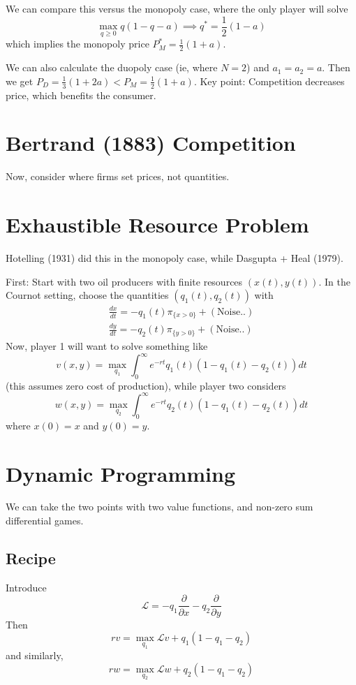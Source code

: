 We can compare this versus the monopoly case, where the only player will solve
\begin{equation}
	\max_{q\geq 0} q(1-q-a)
	\implies
	q^* = \frac12 (1-a)
\end{equation}
which implies the monopoly price $P_M^* = \frac12(1+a)$.

We can also calculate the duopoly case (ie, where $N=2$) and $a_1=a_2=a$. Then we get $P_D = \frac13 (1+2a) < P_M =\frac12 (1+a)$. Key point: Competition decreases price, which benefits the consumer.

\section{Bertrand (1883) Competition}
Now, consider where firms set prices, not quantities.

\section{Exhaustible Resource Problem}
Hotelling (1931) did this in the monopoly case, while Dasgupta + Heal (1979).

First: Start with two oil producers with finite resources $(x(t), y(t))$. In the Cournot setting, choose the quantities $(q_1(t), q_2(t))$ with
\begin{align}
	\frac{dx}{dt} = -q_1(t) \pi_{\{ x > 0 \} } + (\text{Noise..})\\
	\frac{dy}{dt} = -q_2(t) \pi_{\{ y > 0 \} } + (\text{Noise..})
\end{align}
Now, player 1 will want to solve something like
\begin{equation}
	v(x,y) = \max_{q_1} \int_0^\infty e^{-rt} q_1(t) (1-q_1(t) - q_2(t))dt 
\end{equation}
(this assumes zero cost of production), while player two considers
\begin{equation}
	w(x,y) = \max_{q_2} \int_0^\infty e^{-rt} q_2(t) (1-q_1(t) - q_2(t))dt 
\end{equation}
where $x(0)=x$ and $y(0)=y$.

\section{Dynamic Programming}
We can take the two points with two value functions, and non-zero sum differential games.

\subsection{Recipe}
Introduce
\begin{equation}
	\mathcal{L} = -q_1 \frac{\partial}{\partial x} - q_2\frac{\partial}{\partial y}
\end{equation}
Then
\begin{equation}
	rv = \max_{q_1} \mathcal{L}v + q_1(1-q_1-q_2)
\end{equation}
and similarly,
\begin{equation}
	rw = \max_{q_2} \mathcal{L}w + q_2(1-q_1-q_2)
\end{equation}

